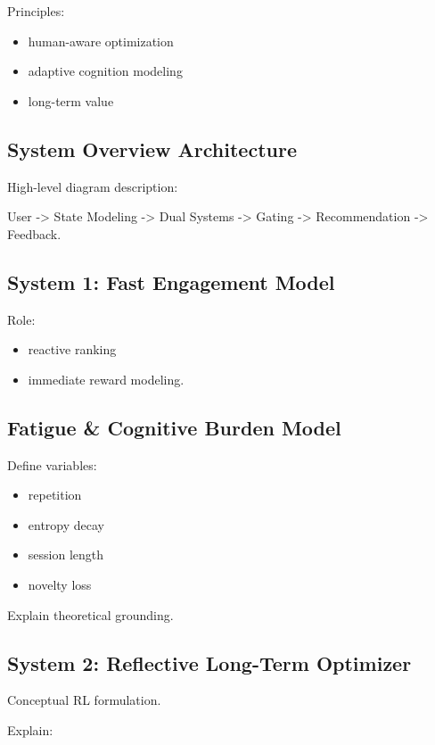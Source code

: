 \documentclass[lettersize,journal]{IEEEtran}
\begin{document}
Principles:

\begin{itemize}
    \item human-aware optimization
    \item adaptive cognition modeling
    \item long-term value
\end{itemize}
    
\subsection{System Overview Architecture}

High-level diagram description:

User -> State Modeling -> Dual Systems -> Gating -> Recommendation -> Feedback.

\subsection{System 1: Fast Engagement Model}

Role:

\begin{itemize}
    \item reactive ranking
    \item immediate reward modeling.
\end{itemize}
    
\subsection{Fatigue \& Cognitive Burden Model}

Define variables:

\begin{itemize}
    \item repetition
    \item entropy decay
    \item session length
    \item novelty loss
\end{itemize}    

Explain theoretical grounding.

\subsection{System 2: Reflective Long-Term Optimizer}

Conceptual RL formulation.

Explain:
\end{document}
